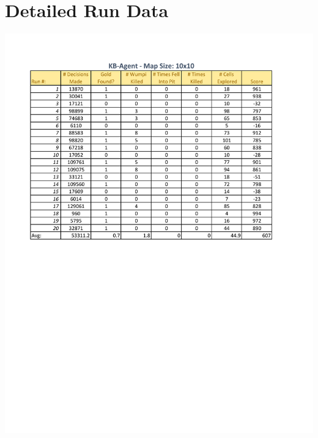 \section{Detailed Run Data}\label{app:DetailedRunData}

\includegraphics[width=\linewidth]{figures/KB-Agent-10x10.pdf}
